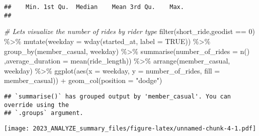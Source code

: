 \documentclass[
]{article}
\newenvironment{Shaded}{\begin{snugshade}}{\end{snugshade}}
\newcommand{\AttributeTok}[1]{\textcolor[rgb]{0.77,0.63,0.00}{#1}}
\newcommand{\CommentTok}[1]{\textcolor[rgb]{0.56,0.35,0.01}{\textit{#1}}}
\newcommand{\ConstantTok}[1]{\textcolor[rgb]{0.00,0.00,0.00}{#1}}
\newcommand{\DecValTok}[1]{\textcolor[rgb]{0.00,0.00,0.81}{#1}}
\newcommand{\FunctionTok}[1]{\textcolor[rgb]{0.00,0.00,0.00}{#1}}
\newcommand{\NormalTok}[1]{#1}
\newcommand{\SpecialCharTok}[1]{\textcolor[rgb]{0.00,0.00,0.00}{#1}}
\newcommand{\StringTok}[1]{\textcolor[rgb]{0.31,0.60,0.02}{#1}}
\begin{document}
\begin{verbatim}
##    Min. 1st Qu.  Median    Mean 3rd Qu.    Max. 
## 
\end{verbatim}

\begin{Shaded}
\begin{Highlighting}[]
\CommentTok{\# Let\textquotesingle{}s visualize the number of rides by rider type}
\FunctionTok{filter}\NormalTok{(short\_ride,geodist }\SpecialCharTok{==} \DecValTok{0}\NormalTok{) }\SpecialCharTok{\%\textgreater{}\%} 
  \FunctionTok{mutate}\NormalTok{(}\AttributeTok{weekday =} \FunctionTok{wday}\NormalTok{(started\_at, }\AttributeTok{label =} \ConstantTok{TRUE}\NormalTok{)) }\SpecialCharTok{\%\textgreater{}\%} 
  \FunctionTok{group\_by}\NormalTok{(member\_casual, weekday) }\SpecialCharTok{\%\textgreater{}\%} 
  \FunctionTok{summarise}\NormalTok{(}\AttributeTok{number\_of\_rides =} \FunctionTok{n}\NormalTok{()}
\NormalTok{            ,}\AttributeTok{average\_duration =} \FunctionTok{mean}\NormalTok{(ride\_length)) }\SpecialCharTok{\%\textgreater{}\%} 
  \FunctionTok{arrange}\NormalTok{(member\_casual, weekday)  }\SpecialCharTok{\%\textgreater{}\%} 
  \FunctionTok{ggplot}\NormalTok{(}\FunctionTok{aes}\NormalTok{(}\AttributeTok{x =}\NormalTok{ weekday, }\AttributeTok{y =}\NormalTok{ number\_of\_rides, }\AttributeTok{fill =}\NormalTok{ member\_casual)) }\SpecialCharTok{+}
  \FunctionTok{geom\_col}\NormalTok{(}\AttributeTok{position =} \StringTok{"dodge"}\NormalTok{)}
\end{Highlighting}
\end{Shaded}

\begin{verbatim}
## `summarise()` has grouped output by 'member_casual'. You can override using the
## `.groups` argument.
\end{verbatim}

\texttt{[image: 2023\_ANALYZE\_summary\_files/figure-latex/unnamed-chunk-4-1.pdf]}
\end{document}
